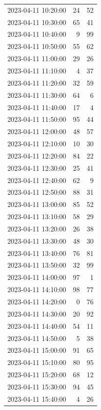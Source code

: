 \documentclass[
  letterpaper,
  DIV=11,
  numbers=noendperiod]{scrartcl}
\begin{document}
\begin{tabular}{lrr}
2023-04-11 10:20:00 &    24 &    52 \\
2023-04-11 10:30:00 &    65 &    41 \\
2023-04-11 10:40:00 &     9 &    99 \\
2023-04-11 10:50:00 &    55 &    62 \\
2023-04-11 11:00:00 &    29 &    26 \\
2023-04-11 11:10:00 &     4 &    37 \\
2023-04-11 11:20:00 &    32 &    59 \\
2023-04-11 11:30:00 &    64 &     6 \\
2023-04-11 11:40:00 &    17 &     4 \\
2023-04-11 11:50:00 &    95 &    44 \\
2023-04-11 12:00:00 &    48 &    57 \\
2023-04-11 12:10:00 &    10 &    30 \\
2023-04-11 12:20:00 &    84 &    22 \\
2023-04-11 12:30:00 &    25 &    41 \\
2023-04-11 12:40:00 &    62 &     9 \\
2023-04-11 12:50:00 &    88 &    31 \\
2023-04-11 13:00:00 &    85 &    52 \\
2023-04-11 13:10:00 &    58 &    29 \\
2023-04-11 13:20:00 &    26 &    38 \\
2023-04-11 13:30:00 &    48 &    30 \\
2023-04-11 13:40:00 &    76 &    81 \\
2023-04-11 13:50:00 &    32 &    99 \\
2023-04-11 14:00:00 &    97 &     1 \\
2023-04-11 14:10:00 &    98 &    77 \\
2023-04-11 14:20:00 &     0 &    76 \\
2023-04-11 14:30:00 &    20 &    92 \\
2023-04-11 14:40:00 &    54 &    11 \\
2023-04-11 14:50:00 &     5 &    38 \\
2023-04-11 15:00:00 &    91 &    65 \\
2023-04-11 15:10:00 &    80 &    95 \\
2023-04-11 15:20:00 &    68 &    12 \\
2023-04-11 15:30:00 &    94 &    45 \\
2023-04-11 15:40:00 &     4 &    26 \\

\end{tabular}
\end{document}

